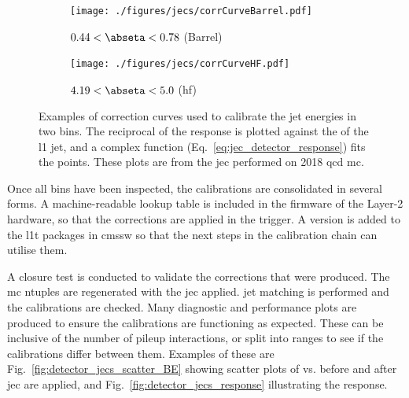 \begin{figure}[htbp]
    \centering
    \begin{subfigure}[b]{0.45\textwidth}
        \texttt{[image: ./figures/jecs/corrCurveBarrel.pdf]}
        \caption{$\text{0.44} < \abseta < \text{0.78}$ (Barrel)}
        \label{fig:detector_jecs_corr_curve_Barrel}
    \end{subfigure}
    \hfill
    \begin{subfigure}[b]{0.45\textwidth}
        \texttt{[image: ./figures/jecs/corrCurveHF.pdf]}
        \caption{$\text{4.19} < \abseta < \text{5.0}$ (\acrshort{hf})}
        \label{fig:detector_jecs_corr_curve_HF}
    \end{subfigure}
\caption[Examples of correction curves used to calibrate the jet energies in two \abseta bins]{Examples of correction curves used to calibrate the \gls{jet} energies in two \abseta bins. The reciprocal of the response is plotted against the \pt of the \acrlong{l1} \gls{jet}, and a complex function (Eq.~\ref{eq:jec_detector_response}) fits the points. These plots are from the \acrlong{jec} performed on 2018 \acrshort{qcd} \acrlong{mc}.}
\label{fig:detector_jecs_corr_curves}
\end{figure}

Once all \abseta bins have been inspected, the calibrations are consolidated in several forms. A machine-readable lookup table is included in the firmware of the Layer-2 hardware, so that the corrections are applied in the trigger. A version is added to the \acrlong{l1t} packages in \acrshort{cmssw} so that the next steps in the calibration chain can utilise them.

A closure test is conducted to validate the corrections that were produced. The \acrshort{mc} ntuples are regenerated with the \acrshort{jec} applied. \Gls{jet} matching is performed and the calibrations are checked. Many diagnostic and performance plots are produced to ensure the calibrations are functioning as expected. These can be inclusive of the number of \gls{pileup} interactions, or split into ranges to see if the calibrations differ between them. Examples of these are Fig.~\ref{fig:detector_jecs_scatter_BE} showing scatter plots of \ptRef vs. \ptLOne before and after \acrshort{jec} are applied, and Fig.~\ref{fig:detector_jecs_response} illustrating the response.

